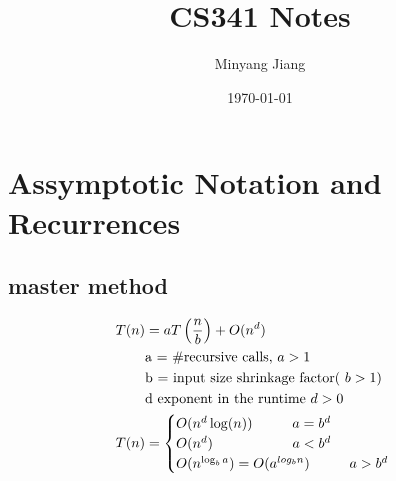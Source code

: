 \documentclass[10pt,usletter]{article}
\title{\huge CS341 Notes}
\author{Minyang Jiang}
\date{\today}
\newcommand{\NP}{\newpage \vspace*{-0.4in}}
\newcommand{\tab}[1][1cm]{\hspace*{#1}}
\begin{document}
\maketitle
\NP
\section{Assymptotic Notation and Recurrences}
\subsection{master method}
\begin{align*}
T(n)&=aT\left(\frac{n}{b}\right) +O(n^d)\\
&\text{a = \#recursive calls, }a>1\\
&\text{b = input size shrinkage factor( }b>1)\\
&\text{d exponent in the runtime } d>0\\
T(n)&=
\begin{cases}
O(n^d\log(n)) \tab  a=b^d\\
O(n^d) \tab[2cm] a < b^d\\
O(n^{\log_ba})=O(a^{log_bn})  \tab a>b^d
\end{cases}
\end{align*}
\end{document}
